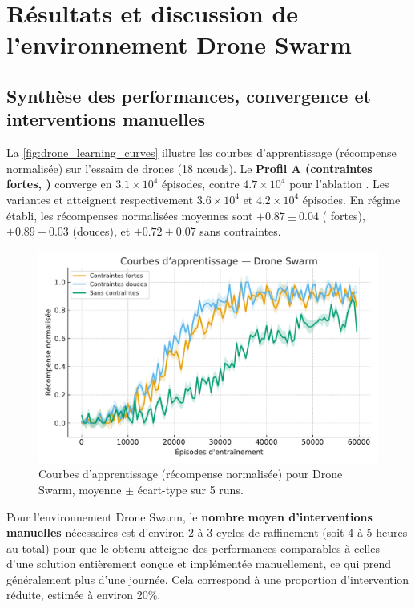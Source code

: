 \section{Résultats et discussion de l'environnement Drone Swarm}\label{sec:results_and_discussion_drone_swarm}

\subsection*{Synthèse des performances, convergence et interventions manuelles}

La \autoref{fig:drone_learning_curves} illustre les courbes d'apprentissage (récompense normalisée) sur l'essaim de drones (18 nœuds).
Le \textbf{Profil A (contraintes fortes, )} converge en $3.1\times 10^4$ épisodes, contre $4.7\times 10^4$ pour l'ablation .
Les variantes  et  atteignent respectivement $3.6\times 10^4$ et $4.2\times 10^4$ épisodes.
En régime établi, les récompenses normalisées moyennes sont $+0.87 \pm 0.04$ ( fortes), $+0.89 \pm 0.03$ (douces), et $+0.72 \pm 0.07$ sans contraintes.

\begin{figure}[h!]
  \centering
  \includegraphics[width=0.75\linewidth]{figures/results_drone_learning.pdf}
  \caption[Courbes d'apprentissage (récompense normalisée) pour Drone Swarm]{Courbes d'apprentissage (récompense normalisée) pour Drone Swarm, moyenne $\pm$ écart-type sur 5 runs.}
  \label{fig:drone_learning_curves}
\end{figure}

Pour l'environnement Drone Swarm, le \textbf{nombre moyen d'interventions manuelles} nécessaires est d'environ 2 à 3 cycles de raffinement (soit 4 à 5 heures au total) pour que le  obtenu atteigne des performances comparables à celles d'une solution entièrement conçue et implémentée manuellement, ce qui prend généralement plus d'une journée. Cela correspond à une proportion d'intervention réduite, estimée à environ 20\%.


